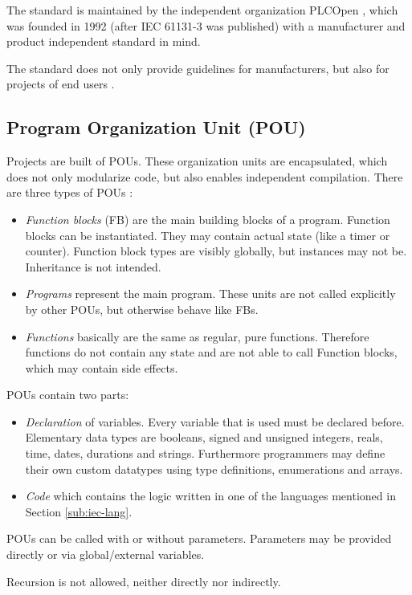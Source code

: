 The standard is maintained by the independent organization PLCOpen \cite{eldijkWhatPLCopen2018}, which was founded in 1992 (after IEC 61131-3 was published) with a manufacturer and product independent standard in mind.


The standard does not only provide guidelines for manufacturers, but also for projects of end users \cite{johnIEC611313Programming2010}.

\subsection{Program Organization Unit (POU)}
\label{sub:pou}
Projects are built of POUs. These organization units are encapsulated, which does not only modularize code, but also enables independent compilation.
There are three types of POUs \cite{johnIEC611313Programming2010}:
\begin{itemize}
	\item \emph{Function blocks} (FB) are the main building blocks of a program. Function blocks can be instantiated. They may contain actual state (like a timer or counter). Function block types are visibly globally, but instances may not be. Inheritance is not intended.
	\item \emph{Programs} represent the main program. These units are not called explicitly by other POUs, but otherwise behave like FBs.
	\item \emph{Functions} basically are the same as regular, pure functions. Therefore functions do not contain any state and are not able to call Function blocks, which may contain side effects. 
\end{itemize}
POUs contain two parts:
\begin{itemize}
	\item \emph{Declaration} of variables. Every variable that is used must be declared before. Elementary data types are booleans, signed and unsigned integers, reals, time, dates, durations and strings. Furthermore programmers may define their own custom datatypes using type definitions, enumerations and arrays.
	\item \emph{Code} which contains the logic written in one of the languages mentioned in Section \ref{sub:iec-lang}.
\end{itemize}
POUs can be called with or without parameters. Parameters may be provided directly or via global/external variables.

Recursion is not allowed, neither directly nor indirectly. 

